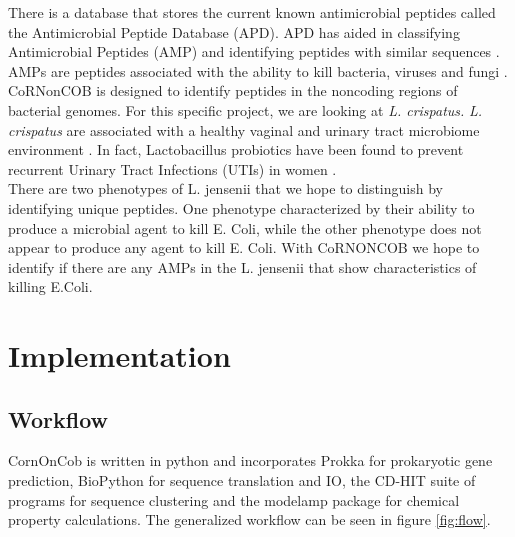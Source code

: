 \documentclass{article}
\begin{document}
There is a database that stores the current known antimicrobial peptides called the Antimicrobial Peptide Database (APD). APD has aided in classifying Antimicrobial Peptides (AMP) and identifying peptides with similar sequences \cite{wang_2004}. AMPs are peptides associated with the ability to kill bacteria, viruses and fungi \cite{izadpanah}. CoRNonCOB is designed to identify peptides in the noncoding regions of bacterial genomes. For this specific project, we are looking at \emph{L. crispatus.} \emph{L. crispatus} are associated with a healthy vaginal and urinary tract microbiome environment \cite{becknell_spencer_2015}. In fact, Lactobacillus probiotics have been found to prevent recurrent Urinary Tract Infections (UTIs) in women \cite{dwyer_dwyer_2012}.
\\

There are two phenotypes of L. jensenii that we hope to distinguish by identifying unique peptides. One phenotype characterized by their ability to produce a microbial agent to kill E. Coli, while the other phenotype does not appear to produce any agent to kill E. Coli. With CoRNONCOB we hope to identify if there are any AMPs in the L. jensenii that show characteristics of killing E.Coli. 


\section{Implementation}

\subsection{Workflow}
CornOnCob is written in python and incorporates Prokka for prokaryotic gene prediction, BioPython for sequence translation and IO, the CD-HIT suite of programs for sequence clustering and the modelamp package for chemical property
calculations. The generalized workflow can be seen in figure \ref{fig:flow}.
\\
\end{document}
